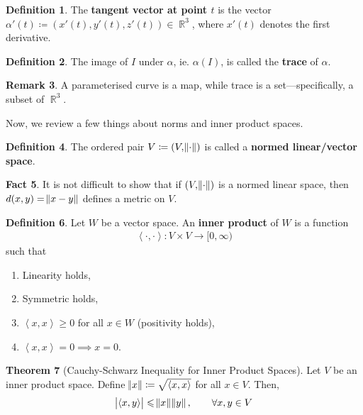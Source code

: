 \documentclass{amsart} %
\theoremstyle{mytheoremstyle}
\theoremstyle{definition}
\newtheorem{definition}{Definition}[section]
\newtheorem{theorem}[definition]{Theorem}
\newtheorem{remark}[definition]{Remark}
\newtheorem{fact}[definition]{Fact}
\numberwithin{equation}{section}
\DeclareMathOperator{\R}{\mathbb{R}}
\DeclareMathOperator{\1}{\mathbbm{1}}
\renewcommand{\leq}{\leqslant}
\renewcommand{\geq}{\geqslant}
\newcommand{\innerproduct}[2]{\left\langle #1,#2 \right\rangle}
\renewcommand{\leq}{\leqslant}
\renewcommand{\geq}{\geqslant}
\begin{document}
\begin{definition}
	\label{deftangentvector}
	The \textbf{tangent vector at point $t$} is the vector $\alpha'(t) \coloneqq (x'(t),y'(t),z'(t)) \in \R^3$, where $x'(t)$ denotes the first derivative.
\end{definition}

\begin{definition}
	\label{deftrace}
	The image of $I$ under $\alpha$, ie. $\alpha(I)$, is called the \textbf{trace} of $\alpha$.
\end{definition}

\begin{remark}
	A parameterised curve is a map, while trace is a set---specifically, a subset of $\R^3$.
\end{remark}

Now, we review a few things about norms and inner product spaces.

\begin{definition}
	The ordered pair $V \coloneqq (V, \norm{\cdot})$ is called a \textbf{normed linear/vector space}.
\end{definition}

\begin{fact}
	It is not difficult to show that if $(V, \norm{\cdot})$ is a normed linear space, then $d(x,y) = \norm{x-y}$ defines a metric on $V$.
\end{fact}

\begin{definition}
	Let $W$ be a vector space. An \textbf{inner product} of $W$ is a function
	\begin{align*}
	\innerproduct{\cdot}{\cdot} : V \times V \to [0,\infty)
	\end{align*}
	such that
	\begin{enumerate}
		\item Linearity holds,
		\item Symmetric holds,
		\item $\innerproduct{x}{x} \geq 0$ for all $x \in W$ (positivity holds),
		\item $\innerproduct{x}{x} = 0 \implies x =0$.
	\end{enumerate}
\end{definition}

\begin{theorem}[Cauchy-Schwarz Inequality for Inner Product Spaces]
	\label{thmcauchyschwarzinnerproduct}
	Let $V$ be an inner product space. Define $\norm{x} \coloneqq \sqrt{\innerproduct{x}{x}}$ for all $x \in V$. Then,
	\begin{align*}
	\abs{\innerproduct{x}{y}} \leq \norm{x} \norm{y}, \qquad \forall x,y \in V
	\end{align*}
\end{theorem}
\end{document}

